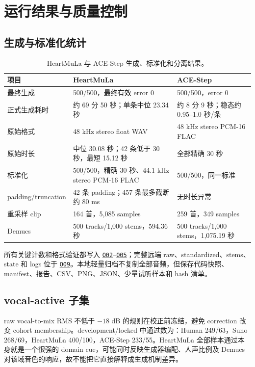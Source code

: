 \documentclass[UTF8,11pt,a4paper,fontset=none]{ctexart}
\newcommand{\outref}[1]{\hyperlink{output:#1}{\texttt{#1}}}
\begin{document}
\section{运行结果与质量控制}
\label{sec:qc}

\subsection{生成与标准化统计}

\begin{table}[H]
\centering
\small
\caption{HeartMuLa 与 ACE-Step 生成、标准化和分离结果。}
\label{tab:generation-qc}
\begin{tabularx}{\linewidth}{lXX}
\toprule
项目 & HeartMuLa & ACE-Step \\
\midrule
最终生成 & 500/500，最终有效 error 0 & 500/500，error 0 \\
正式生成耗时 & 约 69 分 50 秒；单条中位 23.34 秒 & 约 8 分 9 秒；稳态约 0.95--1.0 秒/条 \\
原始格式 & 48 kHz stereo float WAV & 48 kHz stereo PCM-16 FLAC \\
原始时长 & 中位 30.08 秒；42 条低于 30 秒，最短 15.12 秒 & 全部精确 30 秒 \\
标准化 & 500/500，精确 30 秒、44.1 kHz stereo PCM-16 FLAC & 500/500，同一标准 \\
padding/truncation & 42 条 padding；457 条最多截断约 80 ms & 无时长异常 \\
重采样 clip & 164 首，5,085 samples & 259 首，349 samples \\
Demucs & 500 tracks/1,000 stems，594.36 秒 & 500 tracks/1,000 stems，1,075.19 秒 \\
\bottomrule
\end{tabularx}
\end{table}

所有关键计数和格式验证都写入 \outref{O02}--\outref{O05}；完整远端 raw、standardized、stems、state 和 logs 位于 \outref{O09}。本地轻量归档不复制全部音频，但保存代码快照、manifest、报告、CSV、PNG、JSON、少量试听样本和 hash 清单。

\subsection{vocal-active 子集}

raw vocal-to-mix RMS 不低于 $-18$ dB 的规则在校正前冻结，避免 correction 改变 cohort membership。development/locked 中通过数为：Human 249/63，Suno 268/69，HeartMuLa 400/100，ACE-Step 233/55。HeartMuLa 全部样本通过本身就是一个很强的 domain cue，可能同时反映生成器编配、人声比例及 Demucs 对该域音色的响应，故不能把它直接解释成生成机制差异。
\end{document}
